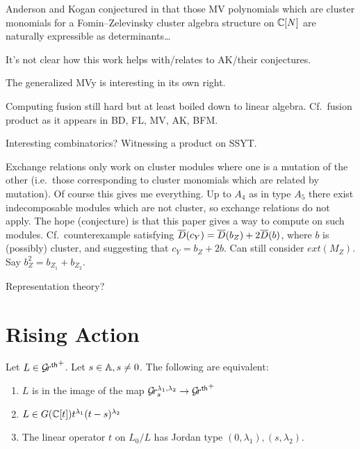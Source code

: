 \documentclass{article}
\begin{document}
Anderson and Kogan conjectured in \cite{anderson2006algebra}  that those MV polynomials which are cluster monomials for a Fomin--Zelevinsky cluster algebra structure on $\CC[N]$ are naturally expressible as determinants\dots

It's not clear how this work helps with/relates to AK/their conjectures.

The generalized MVy is interesting in its own right. 

Computing fusion still hard but at least boiled down to linear algebra. Cf.\ fusion product as it appears in BD, FL, MV, AK, BFM.

Interesting combinatorics? Witnessing a product on SSYT.

Exchange relations only work on cluster modules where one is a mutation of the other (i.e.\ those corresponding to cluster monomials which are related by mutation). Of course this gives me everything. Up to $A_4$ as in type $A_5$ there exist indecomposable modules which are not cluster, so exchange relations do not apply. The hope (conjecture) is that this paper gives a way to compute on such modules. Cf.\ counterexample satisfying $\barD(c_Y) = \barD(b_Z) + 2\barD(b)$, where $b$ is (possibly) cluster, and suggesting that $c_Y = b_Z + 2b$. Can still consider $ext(M_Z)$. Say $b_Z^2 = b_{Z_1} + b_{Z_2}$. 


Representation theory? 

\section{Rising Action} %

\begin{lemma} \label{le:Grl1l2}
    Let $ L \in \Grth^+ $.  Let $ s \in \AA, s \ne 0 $.  The following are equivalent:
    \begin{enumerate}
        \item $ L $ is in the image of the map $ \Gr^{\lambda_1, \lambda_2}_s \rightarrow \Grth^+$
        \item $ L \in G(\CC[t]) t^{\lambda_1} (t-s)^{\lambda_2}$
        \item The linear operator $ t $ on $ L_0/L$ has Jordan type $(0,\lambda_1), (s,\lambda_2)$.
    \end{enumerate}
\end{lemma}
\end{document}
